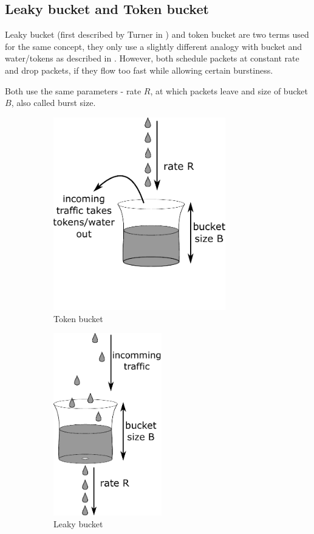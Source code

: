 \subsection{Leaky bucket and Token bucket}
\label{token_bucket}
Leaky bucket (first described by Turner in \cite{turner1986new}) and token bucket are two terms used for the same concept, they only use a slightly different analogy with bucket and water/tokens as described in \cite[Section 5.4.2]{Tanenbaum:2002:CN:572404}. However, both schedule packets at constant rate and drop packets, if they flow too fast while allowing certain burstiness.

Both use the same parameters - rate $R$, at which packets leave and size of bucket $B$, also called burst size.

\begin{figure}
	\centering
	\begin{subfigure}{.6\linewidth}
		\centering
		\includegraphics[width=75mm]{drawings/token_bucket}
		\caption{Token bucket}
		\label{fig08:token}
	\end{subfigure}%
	\begin{subfigure}{.4\linewidth}
		\centering
		\includegraphics[width=47mm]{drawings/leaky_bucket}
		\caption{Leaky bucket}
		\label{fig08:leaky}
	\end{subfigure}
	\caption{}
	\label{fig08:token_leaky}
\end{figure}

